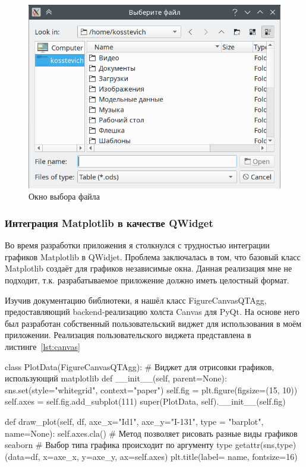 \begin{figure}[H]
	\centering
	\includegraphics[width=1\linewidth]{pics/ris7} %
	\caption{Окно выбора файла}
	\label{fig:ris7} %
\end{figure}

\subsubsection{Интеграция Matplotlib в качестве QWidget}

Во время разработки приложения я столкнулся с трудностью интеграции графиков Matplotlib в QWidjet. Проблема заключалась в том, что базовый класс Matplotlib создаёт для графиков независимые окна. Данная реализация мне не подходит, т.к. разрабатываемое приложение должно иметь целостный формат.

Изучив документацию библиотеки, я нашёл класс FigureCanvasQTAgg, предоставляющий backend-реализацию холста Canvas для PyQt. На основе него был разработан собственный пользовательский виджет для использования в моём приложении. Реализация пользовательского виджета представлена в листинге~\ref{lst:canvas}

\begin{flushleft}
 \label{lst:canvas}
\begin{MyCodes}
class PlotData(FigureCanvasQTAgg): 
	# Виджет для отрисовки графиков, использующий matplotlib
	def __init__(self, parent=None):
		sns.set(style="whitegrid", context="paper")
		self.fig = plt.figure(figsize=(15, 10))
		self.axes = self.fig.add_subplot(111)
		super(PlotData, self).__init__(self.fig)
	
	def draw_plot(self, df, axe_x="Id1",
			axe_y="I-131", type = "barplot", name=None):
		self.axes.cla()
		# Метод позволяет рисовать разные виды графиков seaborn
		# Выбор типа графика происходит по аргументу type
		getattr(sns,type)(data=df, x=axe_x, y=axe_y, ax=self.axes)
		plt.title(label= name, fontsize=16)
\end{MyCodes}
\end{flushleft}

